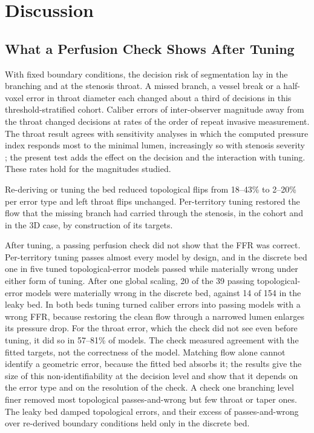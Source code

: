 \documentclass[journal,twoside,web]{ieeecolor}
\begin{document}
\section{Discussion}
\subsection{What a Perfusion Check Shows After Tuning}
With fixed boundary conditions, the decision risk of segmentation lay in the branching and at the stenosis throat. A missed branch, a vessel break or a half-voxel error in throat diameter each changed about a third of decisions in this threshold-stratified cohort. Caliber errors of inter-observer magnitude away from the throat changed decisions at rates of the order of repeat invasive measurement. The throat result agrees with sensitivity analyses
in which the computed pressure index responds most to the minimal lumen, increasingly so with stenosis severity
\cite{sankaran2015tmi,fernandez2024}; the present test adds the effect on the decision and the interaction with
tuning. These rates hold for the magnitudes studied.

Re-deriving or tuning the bed reduced topological flips from 18--43\% to 2--20\% per error type and left throat
flips unchanged. Per-territory
tuning restored the flow that the missing branch had carried through the stenosis, in the cohort and in the 3D case, by construction of its targets.

After tuning, a passing perfusion check did not show that the FFR was correct. Per-territory tuning passes
almost every model by design, and in the discrete bed one in five tuned topological-error models passed while
materially wrong under either form of tuning. After one global scaling, 20 of the 39 passing topological-error models were materially wrong in the discrete bed, against 14 of 154 in the leaky bed. In both beds tuning turned caliber errors into passing models with a wrong FFR, because restoring the clean flow through a narrowed lumen enlarges its pressure drop. For the throat error, which the check did not see even before tuning, it did so in 57--81\% of models. The check measured agreement with the fitted targets, not the correctness of the model. Matching flow alone cannot
identify a geometric error, because the fitted bed absorbs it; the results give the size of this non-identifiability
at the decision level and show that it depends on the error type and on the resolution of the check. A check one
branching level finer removed most topological passes-and-wrong but few throat or taper ones. The leaky
bed damped topological errors, and their excess of passes-and-wrong over re-derived boundary conditions held only in
the discrete bed.
\end{document}
